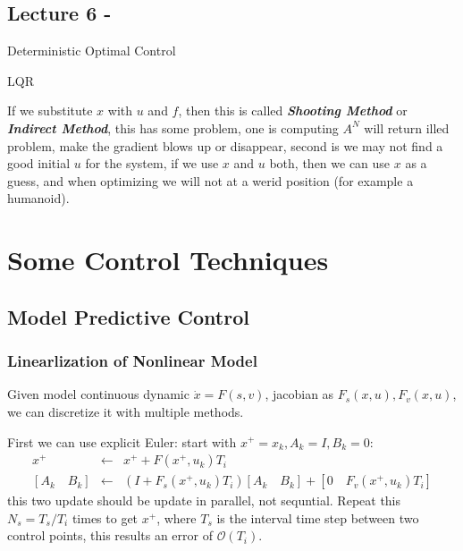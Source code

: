 \documentclass[10pt]{elegantbook}
\newcommand{\mydefination}[1]{\textbf{\textit{\textcolor{structurecolor}{#1}}}}
\begin{document}
\section{Lecture 6 - }

\begin{introduction}
    \item Deterministic Optimal Control
    \item LQR
\end{introduction}

If we substitute $x$ with $u$ and $f$, then this is called \mydefination{Shooting Method} or \mydefination{Indirect Method},
this has some problem, one is computing $A^N$ will return illed problem, make the gradient blows up or disappear, second is
we may not find a good initial $u$ for the system, if we use $x$ and $u$ both, then we can use $x$ as a guess, and when
optimizing we will not at a werid position (for example a humanoid).

\chapter{Some Control Techniques}

\section{Model Predictive Control}

\subsection{Linearlization of Nonlinear Model}

Given model continuous dynamic $\dot x = F(s, v)$, jacobian as $F_s(x, u), F_v(x, u)$, we can discretize it with multiple methods.

First we can use explicit Euler: start with $x^{+} = x_k, A_k = I, B_k = 0$:
\begin{equation}
\begin{array}{rll}
    x^{+} & \leftarrow & x^{+} + F(x^{+}, u_k) T_i \\
    \left[ A_k \quad B_k \right] & \leftarrow & \left( I + F_s(x^{+}, u_k) T_i \right) \left[ A_k \quad B_k \right] + \left[ 0 \quad F_v(x^{+}, u_k) T_i \right]
\end{array}
\end{equation}
this two update should be update in parallel, not sequntial. Repeat this $N_s = T_s / T_i$ times to get $x^{+}$, where $T_s$ is the interval time step between two control points,
this results an error of $\mathcal O(T_i)$.
\end{document}
